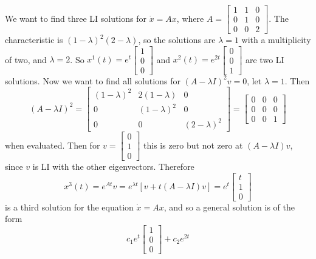 \begin{example}
    We want to find three LI solutions for $\dot x=Ax$, where $A=
    \begin{bmatrix}
        1 & 1 & 0\\ 0 & 1 & 0\\ 0 & 0 & 2
    \end{bmatrix}$. The characteristic is $(1-\lambda)^2(2-\lambda)$, so the solutions are $\lambda=1$ with a multiplicity of two, and $\lambda =2$. So $x^1(t)=e^t 
    \begin{bmatrix}
        1 \\ 0 \\ 0
    \end{bmatrix}$ and $x^2(t)=e^{2t}
    \begin{bmatrix}
        0\\0\\1
    \end{bmatrix}$ are two LI solutions. Now we want to find all solutions for $(A-\lambda I)^2v=0$, let $\lambda=1$. Then \[
    (A-\lambda I)^2=
    \begin{bmatrix}
        (1-\lambda)^2 & 2(1-\lambda) & 0\\
        0 & (1-\lambda)^2 & 0\\
        0 & 0 & (2-\lambda)^2
    \end{bmatrix}=
    \begin{bmatrix}
        0 & 0 & 0\\ 0 & 0 & 0 \\ 0 & 0 & 1
    \end{bmatrix}
    \] when evaluated. Then for $v=
    \begin{bmatrix}
        0 \\ 1 \\ 0
    \end{bmatrix}$ this is zero but not zero at $(A-\lambda I)v$, since $v$ is LI with the other eigenvectors. Therefore \[
    x^3(t)=e^{At}v=e^{\lambda t}\left[ v+t(A-\lambda I)v \right] = e^{t}
    \begin{bmatrix}
        t\\1\\0
    \end{bmatrix}
    \] is a third solution for the equation $\dot x=Ax$, and so a general solution is of the form \[
    c_1e^{t}
    \begin{bmatrix}
        1\\0\\0
    \end{bmatrix}+c_2e^{2t}
\]
\end{example}
